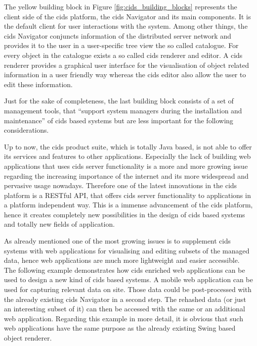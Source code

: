  
The yellow building block in Figure \ref{fig:cids_building_blocks} represents the client side of the cids platform, the cids Navigator and its main components.
It is the default client for user interactions with the system.
Among other things, the cids Navigator conjuncts information of the distributed server network and provides it to the user in a user-specific tree view the so called catalogue.
For every object in the catalogue exists a so called cids renderer and editor.
A cids renderer provides a graphical user interface for the visualisation of object related information in a user friendly way whereas the cids editor also allow the user to edit these information.


Just for the sake of completeness, the last building block consists of a set of management tools, that ``support system managers during the installation and maintenance'' \autocite[]{cismet-cids-readMe} of cids based systems but are less important for the following considerations.

Up to now, the cids product suite, which is totally Java based, is not able to offer its services and features to other applications.
Especially the lack of building web applications that uses cids server functionality is a more and more growing issue regarding the increasing importance of the internet and its more widespread and pervasive usage nowadays.
Therefore one of the latest innovations in the cids platform is a RESTful API, that offers cids server functionality to applications in a platform independent way.
This is a immense advancement of the cids platform, hence it creates completely new possibilities in the design of cids based systems and totally new fields of application.

As already mentioned one of the most growing issues is to supplement cids systems with web applications for visualising and editing subsets of the managed data, hence web applications are much more lightweight and easier accessible.
The following example demonstrates how cids enriched web applications can be used to design a new kind of cids based systems.
A mobile web application can be used for capturing relevant data on site.
Those data could be post-processed with the already existing cids Navigator in a second step.
The rehashed data (or just an interesting subset of it) can then be accessed with the same or an additional web application.
Regarding this example in more detail, it is obvious that such web applications have the same  purpose as the already existing Swing based object renderer.

